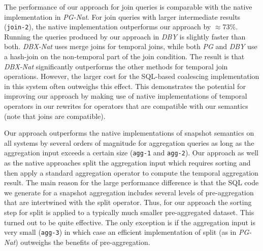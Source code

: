 The performance of our approach for join queries is comparable with
the native implementation in \textit{PG-Nat}. For join queries with larger
intermediate results (\texttt{join-2}), the native implementation
outperforms our approach by $\approx$73\%. Running the queries produced
by our approach in \textit{DBY} is slightly faster than both.
\textit{DBX-Nat} uses merge joins for temporal joins, while both
\textit{PG} and \textit{DBY} use a hash-join on the
non-temporal part of the join condition. The result is that
\textit{DBX-Nat} significantly outperforms the other methods for
temporal join operations. However, the larger cost for the SQL-based
coalescing implementation in this system often outweighs this
effect.  %
This demonstrates the potential for improving our approach by making
use of native implementations of temporal operators in our rewrites
for operators that are compatible with our semantics (note that joins
are compatible).

Our approach outperforms the native implementations of snapshot semantics on all systems by several orders of magnitude for aggregation queries as long as the aggregation input exceeds a certain size (\texttt{agg-1} and \texttt{agg-2}).
Our approach as well as the native approaches split the aggregation input which requires sorting and then apply a standard aggregation operator to compute the temporal aggregation result. %
 The main reason for the large performance difference is that the SQL code we generate for a snapshot aggregation %
includes several levels of pre-aggregation that are intertwined with the split operator. Thus, for our approach the sorting step for split is applied to a typically much smaller pre-aggregated dataset.
This turned out to be quite effective. The only exception is if the aggregation input is very small (\texttt{agg-3}) in which case an efficient implementation of split (as in \textit{PG-Nat}) outweighs the benefits of %
pre-aggregation.

